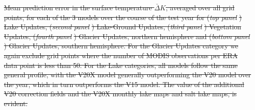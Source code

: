 \documentclass[hess, twostagejnl]{copernicus}
\providecommand{\DIFdel}[1]{{\protect\color{red}\sout{#1}}}                      %
\providecommand{\DIFdelbegin}{} %
\providecommand{\DIFdelend}{} %
\providecommand{\DIFdelFL}[1]{\DIFdel{#1}} %
\begin{document}
{\DIFdelbegin %
{%
\DIFdelFL{Mean prediction error in the surface temperature $\bar{\Delta} K$, averaged over all grid points, for each of the 3 models over the course of the test year for (}\textit{\DIFdelFL{top panel}}%
\DIFdelFL{) Lake Updates, (}\textit{\DIFdelFL{second panel}}%
\DIFdelFL{) Lake-Ground Updates, (}\textit{\DIFdelFL{third panel}}%
\DIFdelFL{) Vegetation Updates, (}\textit{\DIFdelFL{fourth panel}}%
\DIFdelFL{) Glacier Updates, northern hemisphere and (}\textit{\DIFdelFL{bottom panel}}%
\DIFdelFL{) Glacier Updates, southern hemisphere. For the Glacier Updates category we again exclude grid points where the number of MODIS observations per ERA data point is less than 50.  For the Lake categories, all models follow the same general profile, with the V20X model generally outperforming the V20 model over the year, which in turn outperforms the V15 model. The value of the additional V20 correction fields and the V20X monthly lake maps and salt lake maps, is evident.}}
\DIFdelend 


}
\end{document}
